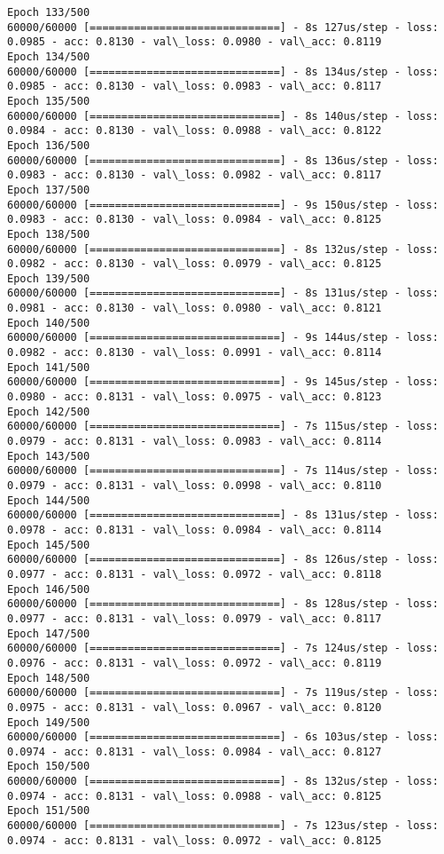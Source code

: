 \documentclass[11pt]{article}
\begin{document}
\begin{Verbatim}[commandchars=\\\{\}]
Epoch 133/500
60000/60000 [==============================] - 8s 127us/step - loss: 0.0985 - acc: 0.8130 - val\_loss: 0.0980 - val\_acc: 0.8119
Epoch 134/500
60000/60000 [==============================] - 8s 134us/step - loss: 0.0985 - acc: 0.8130 - val\_loss: 0.0983 - val\_acc: 0.8117
Epoch 135/500
60000/60000 [==============================] - 8s 140us/step - loss: 0.0984 - acc: 0.8130 - val\_loss: 0.0988 - val\_acc: 0.8122
Epoch 136/500
60000/60000 [==============================] - 8s 136us/step - loss: 0.0983 - acc: 0.8130 - val\_loss: 0.0982 - val\_acc: 0.8117
Epoch 137/500
60000/60000 [==============================] - 9s 150us/step - loss: 0.0983 - acc: 0.8130 - val\_loss: 0.0984 - val\_acc: 0.8125
Epoch 138/500
60000/60000 [==============================] - 8s 132us/step - loss: 0.0982 - acc: 0.8130 - val\_loss: 0.0979 - val\_acc: 0.8125
Epoch 139/500
60000/60000 [==============================] - 8s 131us/step - loss: 0.0981 - acc: 0.8130 - val\_loss: 0.0980 - val\_acc: 0.8121
Epoch 140/500
60000/60000 [==============================] - 9s 144us/step - loss: 0.0982 - acc: 0.8130 - val\_loss: 0.0991 - val\_acc: 0.8114
Epoch 141/500
60000/60000 [==============================] - 9s 145us/step - loss: 0.0980 - acc: 0.8131 - val\_loss: 0.0975 - val\_acc: 0.8123
Epoch 142/500
60000/60000 [==============================] - 7s 115us/step - loss: 0.0979 - acc: 0.8131 - val\_loss: 0.0983 - val\_acc: 0.8114
Epoch 143/500
60000/60000 [==============================] - 7s 114us/step - loss: 0.0979 - acc: 0.8131 - val\_loss: 0.0998 - val\_acc: 0.8110
Epoch 144/500
60000/60000 [==============================] - 8s 131us/step - loss: 0.0978 - acc: 0.8131 - val\_loss: 0.0984 - val\_acc: 0.8114
Epoch 145/500
60000/60000 [==============================] - 8s 126us/step - loss: 0.0977 - acc: 0.8131 - val\_loss: 0.0972 - val\_acc: 0.8118
Epoch 146/500
60000/60000 [==============================] - 8s 128us/step - loss: 0.0977 - acc: 0.8131 - val\_loss: 0.0979 - val\_acc: 0.8117
Epoch 147/500
60000/60000 [==============================] - 7s 124us/step - loss: 0.0976 - acc: 0.8131 - val\_loss: 0.0972 - val\_acc: 0.8119
Epoch 148/500
60000/60000 [==============================] - 7s 119us/step - loss: 0.0975 - acc: 0.8131 - val\_loss: 0.0967 - val\_acc: 0.8120
Epoch 149/500
60000/60000 [==============================] - 6s 103us/step - loss: 0.0974 - acc: 0.8131 - val\_loss: 0.0984 - val\_acc: 0.8127
Epoch 150/500
60000/60000 [==============================] - 8s 132us/step - loss: 0.0974 - acc: 0.8131 - val\_loss: 0.0988 - val\_acc: 0.8125
Epoch 151/500
60000/60000 [==============================] - 7s 123us/step - loss: 0.0974 - acc: 0.8131 - val\_loss: 0.0972 - val\_acc: 0.8125

\end{Verbatim}
\end{document}
